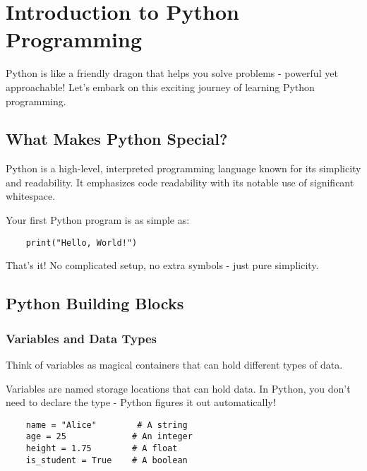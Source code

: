 \chapter{Introduction to Python Programming}
\label{ch:python-intro}

Python is like a friendly dragon that helps you solve problems - powerful yet approachable! Let's embark on this exciting journey of learning Python programming.

\section{What Makes Python Special?}
\label{sec:python-special}

\begin{definition}
    Python is a high-level, interpreted programming language known for its simplicity and readability. It emphasizes code readability with its notable use of significant whitespace.
\end{definition}

\begin{example}
    Your first Python program is as simple as:
    \begin{verbatim}
    print("Hello, World!")
    \end{verbatim}
    That's it! No complicated setup, no extra symbols - just pure simplicity.
\end{example}

\section{Python Building Blocks}
\label{sec:building-blocks}

\subsection{Variables and Data Types}
\label{subsec:variables}

Think of variables as magical containers that can hold different types of data.

\begin{definition}[Variables]
    Variables are named storage locations that can hold data. In Python, you don't need to declare the type - Python figures it out automatically!
\end{definition}

\begin{example}
    \begin{verbatim}
    name = "Alice"        # A string
    age = 25             # An integer
    height = 1.75        # A float
    is_student = True    # A boolean
    \end{verbatim}
\end{example}

